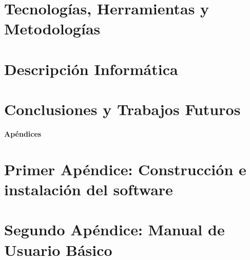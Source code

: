 \documentclass[11pt,twoside,titlepage]{report}
\begin{document}


\blankpage

\chapter{Tecnologías, Herramientas y Metodologías}
\label{chap:tecnologias}




\chapter{Descripción Informática}
\label{chap:descripcionInformatica}



\blankpage


\chapter{Conclusiones y Trabajos Futuros}
\label{chap:conclusiones}


\blankpage



{}

\footnotesize{
%


}



\raggedbottom
\afterpage{\blankpage}

\newpage





\appendix

{}

\mbox{}
\vfill
\begin{center}
\begin{Huge}
\textbf{Apéndices}
\end{Huge}
\end{center}
\vfill
\mbox{}
\thispagestyle{empty}

\newpage
\mbox{}
\thispagestyle{empty}
\newpage



\chapter{Primer Apéndice: Construcción e instalación del software}
\label{chap:apendiceConstruccion}


\chapter{Segundo Apéndice: Manual de Usuario Básico}
\label{chap:manualUsuario}



\end{document}
